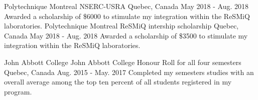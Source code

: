 \begin{cventries}
\cventry
    {Polytechnique Montreal}
    {NSERC-USRA}
    {Quebec, Canada}
    {May 2018 - Aug. 2018}
    {
      {Awarded a scholarship of \$6000 to stimulate my integration within the  ReSMiQ laboratories.}  
    }
\cventry
    {Polytechnique Montreal}
    {ReSMiQ intership scholarship}
    {Quebec, Canada}
    {May 2018 - Aug. 2018}
    {
      {Awarded a scholarship of \$3500 to stimulate my integration within the  ReSMiQ laboratories.}  
    }    \newline

  \cventry
    {John Abbott College}
    {John Abbott College Honour Roll for all four semesters}
    {Quebec, Canada}
    {Aug. 2015 - May. 2017}
    {
      {Completed my semesters
studies with an overall average among the top
ten percent of all students registered in my
program.}  
    }    \newline

\end{cventries}
